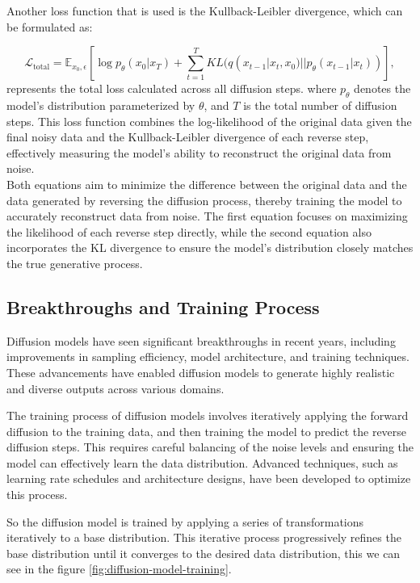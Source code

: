 \documentclass{article}
\begin{document}
			Another loss function that is used is the Kullback-Leibler divergence, which can be formulated as:

			\begin{equation}
				\mathcal{L}_{\text{{total}}} = \mathbb{E}_{x_0,\epsilon}\left[\log p_\theta(x_0|x_T) + \sum_{t=1}^{T}KL(q(x_{t-1}|x_t, x_0)||p_\theta(x_{t-1}|x_t))\right],
			\end{equation}
			represents the total loss calculated across all diffusion steps.
			where $p_\theta$ denotes the model's distribution parameterized by $\theta$, and $T$ is the total number of diffusion steps. This loss function combines the log-likelihood of the original data given the final noisy data and the Kullback-Leibler divergence of each reverse step, effectively measuring the model's ability to reconstruct the original data from noise. \\

			Both equations aim to minimize the difference between the original data and the data generated by reversing the diffusion process, thereby training the model to accurately reconstruct data from noise. The first equation focuses on maximizing the likelihood of each reverse step directly, while the second equation also incorporates the KL divergence to ensure the model's distribution closely matches the true generative process.
	
		
		\subsection{Breakthroughs and Training Process}

			Diffusion models have seen significant breakthroughs in recent years, including improvements in sampling efficiency, model architecture, and training techniques. These advancements have enabled diffusion models to generate highly realistic and diverse outputs across various domains.
			
			The training process of diffusion models involves iteratively applying the forward diffusion to the training data, and then training the model to predict the reverse diffusion steps. This requires careful balancing of the noise levels and ensuring the model can effectively learn the data distribution. Advanced techniques, such as learning rate schedules and architecture designs, have been developed to optimize this process.

			So the diffusion model is trained by applying a series of transformations iteratively to a base distribution. This iterative process progressively refines the base distribution until it converges to the desired data distribution, this we can see in the figure \ref{fig:diffusion-model-training}.
\end{document}
